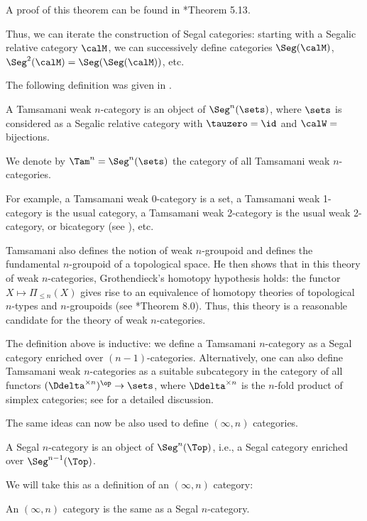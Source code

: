 A proof of this theorem can be found in
 *{Theorem 5.13}.

Thus, we can iterate the construction of Segal categories: starting with a
Segalic relative category $\calM$, we can successively define categories
$\Seg(\calM)$, $\Seg^2(\calM)=\Seg(\Seg(\calM))$, etc.

The following definition was given in .
\begin{definition}
  A Tamsamani weak $n$-category is an object of $\Seg^n(\sets)$, where $\sets$
  is considered as a Segalic relative category with $\tauzero=\id$ and $\calW=$ bijections.

  We denote by $\Tam^n=\Seg^n(\sets)$ the category of all Tamsamani weak
  $n$-categories.
\end{definition}
For example, a Tamsamani weak $0$-category is a set, a Tamsamani weak 1-category
is the usual category, a Tamsamani weak 2-category is the usual weak 2-category,
or bicategory (see ), etc.

Tamsamani also defines the notion of weak $n$-groupoid and defines the
fundamental $n$-groupoid of a topological space. He then shows that in this
theory of weak $n$-categories, Grothendieck's homotopy hypothesis holds: the
functor $X\mapsto \Pi_{\leq n}(X)$ gives rise to an equivalence of homotopy
theories of topological $n$-types and $n$-groupoids (see
*{Theorem 8.0}). Thus, this theory is a reasonable candidate
for the theory of weak $n$-categories.

\begin{remark}
  The definition above is inductive: we define a Tamsamani $n$-category as a
  Segal category enriched over $(n-1)$-categories. Alternatively, one can also
  define Tamsamani weak $n$-categories as a suitable subcategory in the category
  of all functors $(\Ddelta^{\times n})^\op\to \sets$, where $\Ddelta^{\times
  n}$ is the $n$-fold product of simplex categories; see  for a detailed
  discussion.
\end{remark}

The same ideas can now be also used to define $(\infty, n)$ categories.


\begin{definition}\label{d:segal-ncat}
  A Segal $n$-category is an object of $\Seg^n(\Top)$, i.e., a Segal category
  enriched over $\Seg^{n-1}(\Top)$.
\end{definition}


We will take this as a definition of an $(\infty, n)$ category:
\begin{definition}\label{d:infty-ncat}
  An $(\infty, n)$ category is the same as a Segal $n$-category.
\end{definition}

